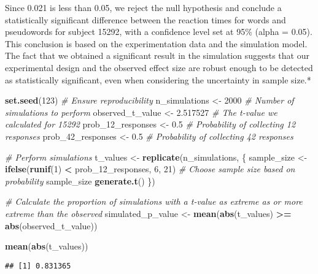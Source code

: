 \documentclass[
]{article}
\newenvironment{Shaded}{\begin{snugshade}}{\end{snugshade}}
\newcommand{\CommentTok}[1]{\textcolor[rgb]{0.56,0.35,0.01}{\textit{#1}}}
\newcommand{\DecValTok}[1]{\textcolor[rgb]{0.00,0.00,0.81}{#1}}
\newcommand{\FloatTok}[1]{\textcolor[rgb]{0.00,0.00,0.81}{#1}}
\newcommand{\FunctionTok}[1]{\textcolor[rgb]{0.13,0.29,0.53}{\textbf{#1}}}
\newcommand{\NormalTok}[1]{#1}
\newcommand{\OtherTok}[1]{\textcolor[rgb]{0.56,0.35,0.01}{#1}}
\newcommand{\SpecialCharTok}[1]{\textcolor[rgb]{0.81,0.36,0.00}{\textbf{#1}}}
\begin{document}
Since 0.021 is less than 0.05, we reject the null hypothesis and
conclude a statistically significant difference between the reaction
times for words and pseudowords for subject 15292, with a confidence
level set at 95\% (alpha = 0.05). This conclusion is based on the
experimentation data and the simulation model. The fact that we obtained
a significant result in the simulation suggests that our experimental
design and the observed effect size are robust enough to be detected as
statistically significant, even when considering the uncertainty in
sample size.*

\begin{Shaded}
\begin{Highlighting}[]
\FunctionTok{set.seed}\NormalTok{(}\DecValTok{123}\NormalTok{)  }\CommentTok{\# Ensure reproducibility}
\NormalTok{n\_simulations }\OtherTok{\textless{}{-}} \DecValTok{2000}  \CommentTok{\# Number of simulations to perform}
\NormalTok{observed\_t\_value }\OtherTok{\textless{}{-}} \FloatTok{2.517527}  \CommentTok{\# The t{-}value we calculated for 15292}
\NormalTok{prob\_12\_responses }\OtherTok{\textless{}{-}} \FloatTok{0.5}  \CommentTok{\# Probability of collecting 12 responses}
\NormalTok{prob\_42\_responses }\OtherTok{\textless{}{-}} \FloatTok{0.5}  \CommentTok{\# Probability of collecting 42 responses}

\CommentTok{\# Perform simulations}
\NormalTok{t\_values }\OtherTok{\textless{}{-}} \FunctionTok{replicate}\NormalTok{(n\_simulations, \{}
\NormalTok{  sample\_size }\OtherTok{\textless{}{-}} \FunctionTok{ifelse}\NormalTok{(}\FunctionTok{runif}\NormalTok{(}\DecValTok{1}\NormalTok{) }\SpecialCharTok{\textless{}}\NormalTok{ prob\_12\_responses, }\DecValTok{6}\NormalTok{, }\DecValTok{21}\NormalTok{)  }\CommentTok{\# Choose sample size based on probability}
\NormalTok{  sample\_size}
  \FunctionTok{generate.t}\NormalTok{()}
\NormalTok{\})}

\CommentTok{\# Calculate the proportion of simulations with a t{-}value as extreme as or more extreme than the observed}
\NormalTok{simulated\_p\_value }\OtherTok{\textless{}{-}} \FunctionTok{mean}\NormalTok{(}\FunctionTok{abs}\NormalTok{(t\_values) }\SpecialCharTok{\textgreater{}=} \FunctionTok{abs}\NormalTok{(observed\_t\_value))}


\FunctionTok{mean}\NormalTok{(}\FunctionTok{abs}\NormalTok{(t\_values))}
\end{Highlighting}
\end{Shaded}

\begin{verbatim}
## [1] 0.831365
\end{verbatim}
\end{document}
